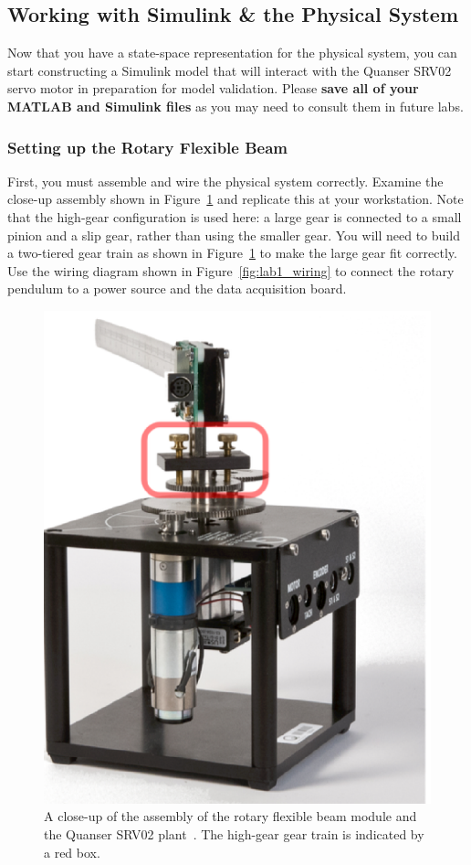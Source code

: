 \documentclass[12pt]{report}
\begin{document}
\subsection{Working with Simulink \& the Physical System}\label{subsection:lab1_simulink}
Now that you have a state-space representation for the physical system, you can start constructing a Simulink model that will interact with the Quanser SRV02 servo motor in preparation for model validation. Please \textbf{save all of your MATLAB and Simulink files} as you may need to consult them in future labs.
\subsubsection{Setting up the Rotary Flexible Beam}\label{sub subsection:lab1_setup}
First, you must assemble and wire the physical system correctly. Examine the close-up assembly shown in Figure~\ref{fig:lab1_assembly} and replicate this at your workstation. Note that the high-gear configuration is used here: a large gear is connected to a small pinion and a slip gear, rather than using the smaller gear. You will need to build a two-tiered gear train as shown in Figure~\ref{fig:lab1_assembly} to make the large gear fit correctly. Use the wiring diagram shown in Figure~\ref{fig:lab1_wiring} to connect the rotary pendulum to a power source and the data acquisition board.
\begin{figure}[htb!]
    \centering
    \includegraphics[width=.3\linewidth]{eps/lab_1/assembly.eps}
    \caption{A close-up of the assembly of the rotary flexible beam module and the Quanser SRV02 plant~\cite{Q-Flex-Beam}. The high-gear gear train is indicated by a red box.}
    \label{fig:lab1_assembly}
\end{figure}
\end{document}
